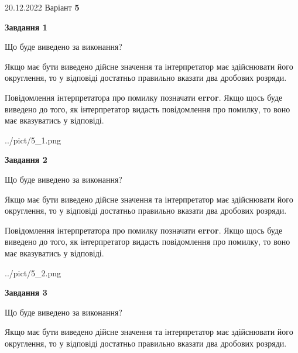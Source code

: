\documentclass[12pt, ukrainian]{article}
\begin{document}
{20.12.2022 Варіант \No \textbf { 5 }\par}
{
\begin {Large}

{\begin {center}\textbf{Завдання 1}\end {center}}\par
Що буде виведено за виконання? \par

Якщо має бути виведено дійсне значення та інтерпретатор має здійснювати його округлення, 
то у відповіді достатньо правильно вказати два дробових розряди.

Повідомлення інтерпретатора про помилку позначати \textbf{error}.
Якщо щось буде виведено до того, як інтерпретатор видасть повідомлення про помилку, 
то воно має вказуватись у відповіді. \par

\begin{center}
	{../pict/5_1.png}
\end{center}
\newpage

{\begin {center}\textbf{Завдання 2}\end {center}}\par
Що буде виведено за виконання? \par

Якщо має бути виведено дійсне значення та інтерпретатор має здійснювати його округлення, 
то у відповіді достатньо правильно вказати два дробових розряди.

Повідомлення інтерпретатора про помилку позначати \textbf{error}.
Якщо щось буде виведено до того, як інтерпретатор видасть повідомлення про помилку, 
то воно має вказуватись у відповіді. \par

\begin{center}
	{../pict/5_2.png}
\end{center}
\newpage

{\begin {center}\textbf{Завдання 3}\end {center}}\par
Що буде виведено за виконання? \par

Якщо має бути виведено дійсне значення та інтерпретатор має здійснювати його округлення, 
то у відповіді достатньо правильно вказати два дробових розряди.


\end{Large}}
\end{document}
